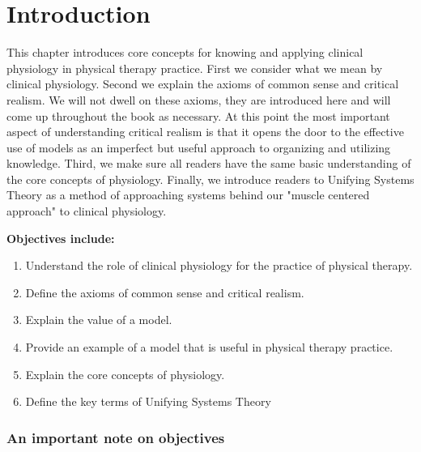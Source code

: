 \chapter*{Introduction}
\minitoc

This chapter introduces core concepts for knowing and applying clinical physiology in physical therapy practice. First we consider what we mean by clinical physiology. Second we explain the axioms of common sense and critical realism. We will not dwell on these axioms, they are introduced here and will come up throughout the book as necessary. At this point the most important aspect of understanding critical realism is that it opens the door to the effective use of models as an imperfect but useful approach to organizing and utilizing knowledge. Third, we make sure all readers have the same basic understanding of the core concepts of physiology. Finally, we introduce readers to Unifying Systems Theory as a method of approaching systems behind our "muscle centered approach" to clinical physiology. 

\vspace{5mm}

\textbf{Objectives include:}
\begin{enumerate}
    \item Understand the role of clinical physiology for the practice of physical therapy.
    \item Define the axioms of common sense and critical realism.
    \item Explain the value of a model.
    \item Provide an example of a model that is useful in physical therapy practice.
    \item Explain the core concepts of physiology.
    \item Define the key terms of Unifying Systems Theory
\end{enumerate}

\subsection{An important note on objectives}

